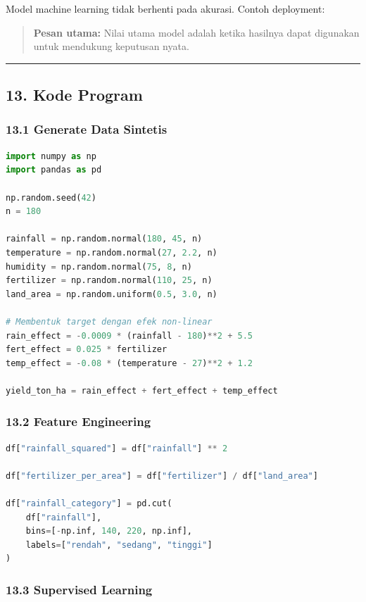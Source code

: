 \documentclass[12pt,a4paper]{article}
\begin{document}
Model machine learning tidak berhenti pada akurasi. Contoh deployment:



\begin{quote}
\textbf{Pesan utama:} Nilai utama model adalah ketika hasilnya dapat digunakan untuk mendukung keputusan nyata.\end{quote}


\hrule


\subsection{13. Kode Program}

\subsubsection{13.1 Generate Data Sintetis}

\begin{lstlisting}[language=Python]
import numpy as np
import pandas as pd

np.random.seed(42)
n = 180

rainfall = np.random.normal(180, 45, n)
temperature = np.random.normal(27, 2.2, n)
humidity = np.random.normal(75, 8, n)
fertilizer = np.random.normal(110, 25, n)
land_area = np.random.uniform(0.5, 3.0, n)

# Membentuk target dengan efek non-linear
rain_effect = -0.0009 * (rainfall - 180)**2 + 5.5
fert_effect = 0.025 * fertilizer
temp_effect = -0.08 * (temperature - 27)**2 + 1.2

yield_ton_ha = rain_effect + fert_effect + temp_effect
\end{lstlisting}

\subsubsection{13.2 Feature Engineering}

\begin{lstlisting}[language=Python]
df["rainfall_squared"] = df["rainfall"] ** 2

df["fertilizer_per_area"] = df["fertilizer"] / df["land_area"]

df["rainfall_category"] = pd.cut(
    df["rainfall"],
    bins=[-np.inf, 140, 220, np.inf],
    labels=["rendah", "sedang", "tinggi"]
)
\end{lstlisting}

\subsubsection{13.3 Supervised Learning}
\end{document}
